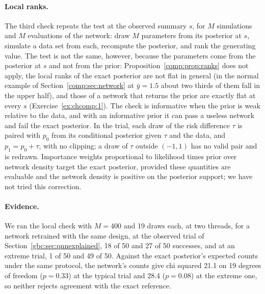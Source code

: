 \paragraph{Local ranks.} The third check repeats the test at the observed summary $s$, for $M$ simulations and $M$ evaluations of the network: draw $M$ parameters from its posterior at $s$, simulate a data set from each, recompute the posterior, and rank the generating value. The test is not the same, however, because the parameters come from the posterior at $s$ and not from the prior: Proposition~\ref{comp:prop:ranks} does not apply, the local ranks of the exact posterior are not flat in general (in the normal example of Section~\ref{comp:sec:network} at $\bar y = 1.5$ about two thirds of them fall in the upper half), and those of a network that returns the prior are exactly flat at every $s$ (Exercise~\ref{ex:chcomp:1}). The check is informative when the prior is weak relative to the data, and with an informative prior it can pass a useless network and fail the exact posterior. In the trial, each draw of the risk difference $\tau$ is paired with $p_0$ from its conditional posterior given $\tau$ and the data, and $p_1 = p_0 + \tau$, with no clipping; a draw of $\tau$ outside $(-1, 1)$ has no valid pair and is redrawn. Importance weights proportional to likelihood times prior over network density target the exact posterior, provided these quantities are evaluable and the network density is positive on the posterior support; we have not tried this correction. 

\paragraph{Evidence.} We ran the local check with $M = 400$ and 19 draws each, at two threads, for a network retrained with the same design, at the observed trial of Section~\ref{gbc:sec:qnnexplained}, 18 of 50 and 27 of 50 successes, and at an extreme trial, 1 of 50 and 49 of 50. Against the exact posterior's expected counts under the same protocol, the network's counts give chi squared 21.1 on 19 degrees of freedom ($p = 0.33$) at the typical trial and 28.4 ($p = 0.08$) at the extreme one, so neither rejects agreement with the exact reference.

